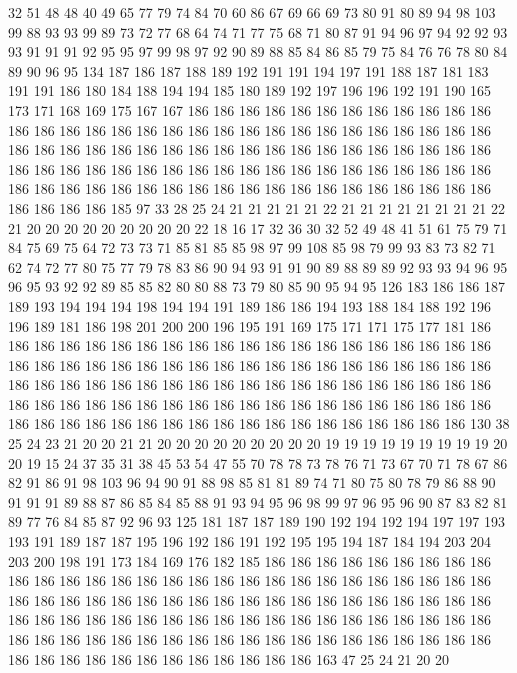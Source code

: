 32 51 48 48 40 49 65 77 79 74 84 70 60 86 67 69 66 69 73 80
91 80 89 94 98 103 99 88 93 93 99 89 73 72 77 68 64 74 71 77
75 68 71 80 87 91 94 96 97 94 92 92 93 93 91 91 91 92 95 95
97 99 98 97 92 90 89 88 85 84 86 85 79 75 84 76 76 78 80 84
89 90 96 95 134 187 186 187 188 189 192 191 191 194 197 191 188 187 181 183
191 191 186 180 184 188 194 194 185 180 189 192 197 196 196 192 191 190 165 173
171 168 169 175 167 167 186 186 186 186 186 186 186 186 186 186 186 186 186 186
186 186 186 186 186 186 186 186 186 186 186 186 186 186 186 186 186 186 186 186
186 186 186 186 186 186 186 186 186 186 186 186 186 186 186 186 186 186 186 186
186 186 186 186 186 186 186 186 186 186 186 186 186 186 186 186 186 186 186 186
186 186 186 186 186 186 186 186 186 186 186 186 186 186 186 186 186 186 185 97
33 28 25 24 21 21 21 21 21 22 21 21 21 21 21 21 21 21 22 21
20 20 20 20 20 20 20 20 20 22 18 16 17 32 36 30 32 52 49 48
41 51 61 75 79 71 84 75 69 75 64 72 73 73 71 85 81 85 85 98
97 99 108 85 98 79 99 93 83 73 82 71 62 74 72 77 80 75 77 79
78 83 86 90 94 93 91 91 90 89 88 89 89 92 93 93 94 96 95 96
95 93 92 92 89 85 85 82 80 80 88 73 79 80 85 90 95 94 95 126
183 186 186 187 189 193 194 194 194 198 194 194 191 189 186 186 194 193 188 184
188 192 196 196 189 181 186 198 201 200 200 196 195 191 169 175 171 171 175 177
181 186 186 186 186 186 186 186 186 186 186 186 186 186 186 186 186 186 186 186
186 186 186 186 186 186 186 186 186 186 186 186 186 186 186 186 186 186 186 186
186 186 186 186 186 186 186 186 186 186 186 186 186 186 186 186 186 186 186 186
186 186 186 186 186 186 186 186 186 186 186 186 186 186 186 186 186 186 186 186
186 186 186 186 186 186 186 186 186 186 186 186 186 186 186 186 130 38 25 24
23 21 20 20 21 21 20 20 20 20 20 20 20 20 20 19 19 19 19 19
19 19 19 19 20 20 19 15 24 37 35 31 38 45 53 54 47 55 70 78
78 73 78 76 71 73 67 70 71 78 67 86 82 91 86 91 98 103 96 94
90 91 88 98 85 81 81 89 74 71 80 75 80 78 79 86 88 90 91 91
91 89 88 87 86 85 84 85 88 91 93 94 95 96 98 99 97 96 95 96
90 87 83 82 81 89 77 76 84 85 87 92 96 93 125 181 187 187 189 190
192 194 192 194 197 197 193 193 191 189 187 187 195 196 192 186 191 192 195 195
194 187 184 194 203 204 203 200 198 191 173 184 169 176 182 185 186 186 186 186
186 186 186 186 186 186 186 186 186 186 186 186 186 186 186 186 186 186 186 186
186 186 186 186 186 186 186 186 186 186 186 186 186 186 186 186 186 186 186 186
186 186 186 186 186 186 186 186 186 186 186 186 186 186 186 186 186 186 186 186
186 186 186 186 186 186 186 186 186 186 186 186 186 186 186 186 186 186 186 186
186 186 186 186 186 186 186 186 186 186 186 186 186 163 47 25 24 21 20 20

